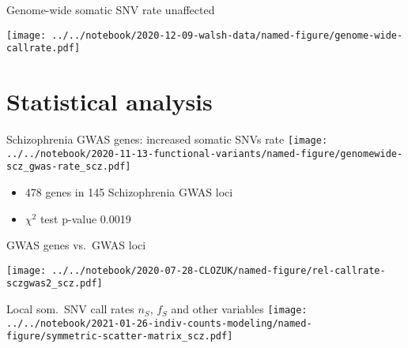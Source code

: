 \documentclass[usenames,dvipsnames]{beamer}
\begin{document}

\begin{frame}{Genome-wide somatic SNV rate unaffected}
\begin{center}
\texttt{[image: ../../notebook/2020-12-09-walsh-data/named-figure/genome-wide-callrate.pdf]}
\end{center}
\end{frame}

\section{Statistical analysis}

\begin{frame}{Schizophrenia GWAS genes: increased somatic SNVs rate}
\texttt{[image: ../../notebook/2020-11-13-functional-variants/named-figure/genomewide-scz\_gwas-rate\_scz.pdf]}
\begin{itemize}
\item 478 genes in 145 Schizophrenia GWAS loci
\item \(\chi^2\) test p-value 0.0019
\end{itemize}
\end{frame}

\begin{frame}{GWAS genes vs.~GWAS loci}
\begin{center}
\texttt{[image: ../../notebook/2020-07-28-CLOZUK/named-figure/rel-callrate-sczgwas2\_scz.pdf]}
\end{center}
\end{frame}

\begin{frame}{Local som.~SNV call rates $n_S$, $f_S$ and other variables}
\texttt{[image: ../../notebook/2021-01-26-indiv-counts-modeling/named-figure/symmetric-scatter-matrix\_scz.pdf]}
\end{frame}
\end{document}
